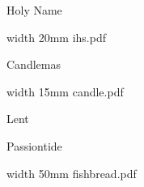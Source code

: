 \paginaproxima

\beginpart Holy Name


\bigskip



\saveimageresource width 20mm {ihs.pdf}

\centerline{\useimageresource \lastsavedimageresourceindex}



\eject


\bigskip

\bigskip



\eject

\beginpart Candlemas


\bigskip

\saveimageresource width 15mm {candle.pdf}

\centerline{\useimageresource \lastsavedimageresourceindex}




\bigskip

\eject

\beginpart Lent


\paginaproxima


\paginaproxima

\beginpart Passiontide


\bigskip

\paginaproxima


\bigskip



\eject


\bigskip

\saveimageresource width 50mm {fishbread.pdf}

